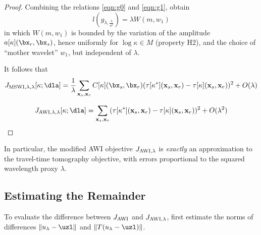 \begin{proof}
Combining the relations \ref{eqn:g0} and \ref{eqn:g1}, obtain
\begin{equation}
  \label{eqn:pwg}
  l(g_{\lambda,\frac{\lambda}{a^2}}) =\lambda W(m,w_1)
\end{equation}
in which $W(m,w_1)$ is bounded by the variation of the amplitude
$a[\kappa](\bx_r,\bx_s)$, hence uniformly for $\log \kappa \in M$ (property
H2), and the choice of ``mother wavelet'' $w_1$, but
independent of $\lambda$.

It follows that
\begin{equation}
  \label{eqn:mswitt}
  J_{\rm MSWI,\lambda,\lambda}[\kappa;\dla] =
  \frac{1}{\lambda} \sum_{{\bf x}_s,{\bf x}_r} C[\kappa](\bx_s,\bx_r)(\tau[\kappa^*]({\bf
  x}_s,{\bf x}_r)-\tau[\kappa]({\bf x}_s,{\bf x}_r))^2 + O(\lambda)
\end{equation}
  
\begin{equation}
  \label{eqn:awitt}
J_{\rm AWI,\lambda,\lambda}[\kappa;\dla] = \sum_{{\bf x}_s,{\bf x}_r} (\tau[\kappa^*]({\bf
  x}_s,{\bf x}_r)-\tau[\kappa]({\bf x}_s,{\bf x}_r))^2 + O(\lambda^2)
\end{equation}

\end{proof}

In particular, the modified AWI objective $J_{\rm AWI,\lambda}$ is {\em exactly} an approximation to
the travel-time tomography objective, with errors proportional to the squared
wavelength proxy $\lambda$.

\subsection{Estimating the Remainder}




To evaluate the difference between $J_{\rm AWI}$ and
$J_{\rm AWI,\lambda}$, first estimate the norms of differences
$\|u_{\lambda} - \uzl\|$ and $\|T(u_{\lambda} -
\uzl)\|$.

